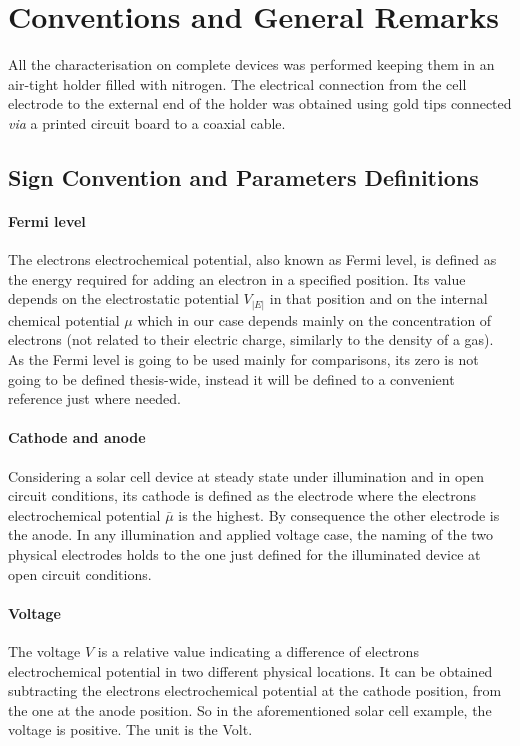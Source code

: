 

\section{Conventions and General Remarks}

	All the characterisation on complete devices was performed keeping them in an air-tight holder filled with nitrogen.
	The electrical connection from the cell electrode to the external end of the holder was obtained using gold tips connected \textsl{via} a printed circuit board to a coaxial cable.

	\subsection{Sign Convention and Parameters Definitions}

		\paragraph{Fermi level}
		The electrons electrochemical potential, also known as Fermi level, is defined as the energy required for adding an electron in a specified position.
		Its value depends on the electrostatic potential $V_|E|$ in that position and on the internal chemical potential $\mu$ which in our case depends mainly on the concentration of electrons (not related to their electric charge, similarly to the density of a gas).
		As the Fermi level is going to be used mainly for comparisons, its zero is not going to be defined thesis-wide, instead it will be defined to a convenient reference just where needed.

		\paragraph{Cathode and anode}
		Considering a solar cell device at steady state under illumination and in open circuit conditions, its cathode is defined as the electrode where the electrons electrochemical potential $\bar\mu$ is the highest.
		By consequence the other electrode is the anode.
		In any illumination and applied voltage case, the naming of the two physical electrodes holds to the one just defined for the illuminated device at open circuit conditions.

		\paragraph{Voltage}
		The voltage $V$ is a relative value indicating a difference of electrons electrochemical potential in two different physical locations.
		It can be obtained subtracting the electrons electrochemical potential at the cathode position, from the one at the anode position.
		So in the aforementioned solar cell example, the voltage is positive.
		The unit is the Volt.


